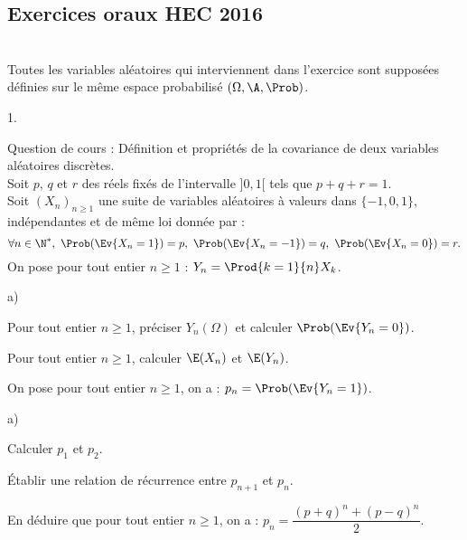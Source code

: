 \subsection*{Exercices oraux HEC 2016}


\begin{exerciceAP}~\\
Toutes les variables aléatoires qui interviennent dans l'exercice sont 
supposées définies sur le même espace probabilisé 
$(\Omega,\A,\Prob)$.
\begin{noliste}{1.}
    \setlength{\itemsep}{2mm}
  \item Question de cours : Définition et propriétés de la covariance 
  de deux variables aléatoires discrètes.\\
  Soit $p$, $q$ et $r$ des réels fixés de l'intervalle $]0,1[$ tels que 
  $p+q+r=1$. \\
  Soit $(X_n)_{n\geq 1}$ une suite de variables aléatoires à 
  valeurs dans $\{-1,0,1\}$, indépendantes et de même loi donnée par :
  \[
    \forall n \in\N^*, \ \Prob(\Ev{X_n=1})=p, \ \Prob(\Ev{X_n=-1})=q, \ 
    \Prob(\Ev{X_n=0})=r.
  \]
  On pose pour tout entier $n\geq 1$ : $Y_n=\Prod{k=1}{n} X_k$.
  
  \item 
  \begin{noliste}{a)}
    \setlength{\itemsep}{2mm}
    \item Pour tout entier $n\geq 1$, préciser $Y_n(\Omega)$ et 
    calculer $\Prob(\Ev{Y_n=0})$.
    
    \item Pour tout entier $n\geq 1$, calculer $\E(X_n)$ et $\E(Y_n)$.
  \end{noliste}
  
  \item On pose pour tout entier $n\geq 1$, on a : 
  $p_n=\Prob(\Ev{Y_n=1})$.
  \begin{noliste}{a)}
    \setlength{\itemsep}{2mm}
    \item Calculer $p_1$ et $p_2$.
    
    \item Établir une relation de récurrence entre $p_{n+1}$ et 
    $p_n$.
    
    \item En déduire que pour tout entier $n\geq 1$, on a : 
    $p_n=\dfrac{(p+q)^n +(p-q)^n}{2}$.
    

\end{noliste}
\end{noliste}
\end{exerciceAP}
